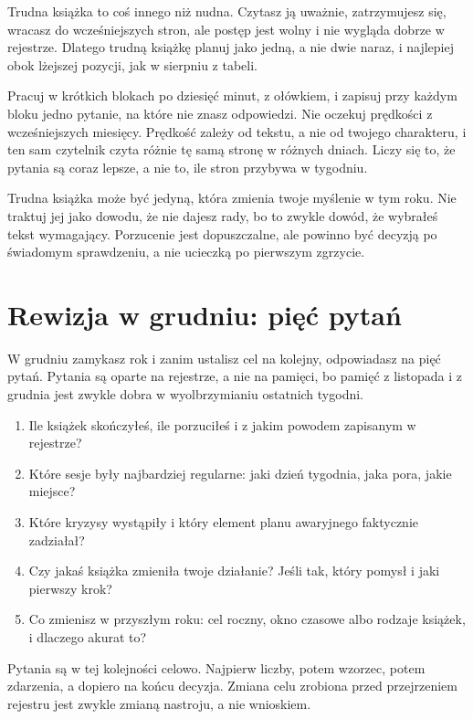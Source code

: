 Trudna książka to coś innego niż nudna. Czytasz ją uważnie, zatrzymujesz się, wracasz do wcześniejszych stron, ale postęp jest wolny i nie wygląda dobrze w rejestrze. Dlatego trudną książkę planuj jako jedną, a nie dwie naraz, i najlepiej obok lżejszej pozycji, jak w sierpniu z tabeli.

Pracuj w krótkich blokach po dziesięć minut, z ołówkiem, i zapisuj przy każdym bloku jedno pytanie, na które nie znasz odpowiedzi. Nie oczekuj prędkości z wcześniejszych miesięcy. Prędkość zależy od tekstu, a nie od twojego charakteru, i ten sam czytelnik czyta różnie tę samą stronę w różnych dniach. Liczy się to, że pytania są coraz lepsze, a nie to, ile stron przybywa w tygodniu.

\begin{uwaga}
Trudna książka może być jedyną, która zmienia twoje myślenie w tym roku. Nie traktuj jej jako dowodu, że nie dajesz rady, bo to zwykle dowód, że wybrałeś tekst wymagający. Porzucenie jest dopuszczalne, ale powinno być decyzją po świadomym sprawdzeniu, a nie ucieczką po pierwszym zgrzycie.
\end{uwaga}

\section{Rewizja w grudniu: pięć pytań}

W grudniu zamykasz rok i zanim ustalisz cel na kolejny, odpowiadasz na pięć pytań. Pytania są oparte na rejestrze, a nie na pamięci, bo pamięć z listopada i z grudnia jest zwykle dobra w wyolbrzymianiu ostatnich tygodni.

\begin{enumerate}
\item Ile książek skończyłeś, ile porzuciłeś i z jakim powodem zapisanym w rejestrze?
\item Które sesje były najbardziej regularne: jaki dzień tygodnia, jaka pora, jakie miejsce?
\item Które kryzysy wystąpiły i który element planu awaryjnego faktycznie zadziałał?
\item Czy jakaś książka zmieniła twoje działanie? Jeśli tak, który pomysł i jaki pierwszy krok?
\item Co zmienisz w przyszłym roku: cel roczny, okno czasowe albo rodzaje książek, i dlaczego akurat to?
\end{enumerate}

Pytania są w tej kolejności celowo. Najpierw liczby, potem wzorzec, potem zdarzenia, a dopiero na końcu decyzja. Zmiana celu zrobiona przed przejrzeniem rejestru jest zwykle zmianą nastroju, a nie wnioskiem.

